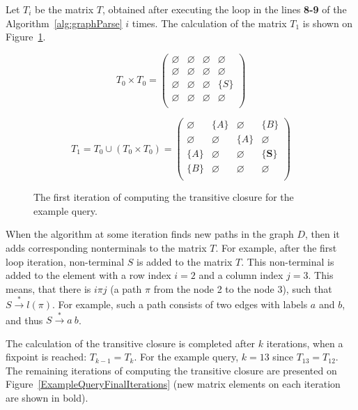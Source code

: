 Let $T_i$ be the matrix $T$, obtained after executing the loop in the lines \textbf{8-9} of the Algorithm~\ref{alg:graphParse} $i$ times. The calculation of the matrix $T_1$ is shown on Figure~\ref{ExampleQueryFirstIteration}.

\begin{figure}[h]
\[
T_0 \times T_0 = \begin{pmatrix}
	\varnothing & \varnothing & \varnothing & \varnothing \\
	\varnothing & \varnothing & \varnothing & \varnothing \\
	\varnothing & \varnothing & \varnothing & \{S\}       \\
	\varnothing & \varnothing & \varnothing & \varnothing \\
\end{pmatrix}
\]

\[
T_1 = T_0 \cup (T_0 \times T_0) = \begin{pmatrix}
	\varnothing & \{A\}       & \varnothing & \{B\}       \\
	\varnothing & \varnothing & \{A\}       & \varnothing \\
	\{A\}       & \varnothing & \varnothing & \{\pmb{S}\}       \\
	\{B\}       & \varnothing & \varnothing & \varnothing \\
\end{pmatrix}
\]
\caption{The first iteration of computing the transitive closure for the example query.}
\label{ExampleQueryFirstIteration}
\end{figure}

When the algorithm at some iteration finds new paths in the graph $D$, then it adds corresponding nonterminals to the matrix $T$. For example, after the first loop iteration, non-terminal $S$ is added to the matrix $T$. This non-terminal is added to the element with a row index $i = 2$ and a column index $j = 3$. This means, that there is $i\pi j$ (a path $\pi$ from the node 2 to the node 3), such that $S \xrightarrow{*} l(\pi)$. For example, such a path consists of two edges with labels $a$ and $b$, and thus $S \xrightarrow{*} a \ b$.

The calculation of the transitive closure is completed after $k$ iterations, when a fixpoint is reached: $T_{k-1} = T_k$. For the example query, $k = 13$ since $T_{13} = T_{12}$. The remaining iterations of computing the transitive closure are presented on Figure~\ref{ExampleQueryFinalIterations} (new matrix elements on each iteration are shown in bold).

